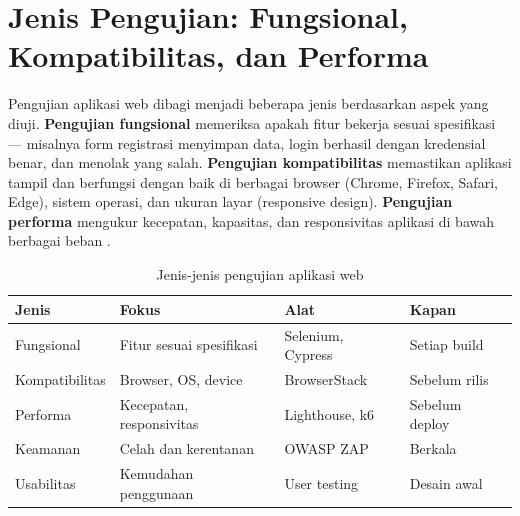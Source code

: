 ﻿\section{Jenis Pengujian: Fungsional, Kompatibilitas, dan Performa}

Pengujian aplikasi web dibagi menjadi beberapa jenis berdasarkan aspek yang diuji. \textbf{Pengujian fungsional} memeriksa apakah fitur bekerja sesuai spesifikasi --- misalnya form registrasi menyimpan data, login berhasil dengan kredensial benar, dan menolak yang salah. \textbf{Pengujian kompatibilitas} memastikan aplikasi tampil dan berfungsi dengan baik di berbagai browser (Chrome, Firefox, Safari, Edge), sistem operasi, dan ukuran layar (responsive design). \textbf{Pengujian performa} mengukur kecepatan, kapasitas, dan responsivitas aplikasi di bawah berbagai beban \cite{mdnToolsTesting}.

\begin{table}[H]
\centering
\begin{tabular}{|P{2.5cm}|P{4.5cm}|P{3cm}|P{2.5cm}|}
\hline
\textbf{Jenis} & \textbf{Fokus} & \textbf{Alat} & \textbf{Kapan} \\
\hline
Fungsional & Fitur sesuai spesifikasi & Selenium, Cypress & Setiap build \\
\hline
Kompatibilitas & Browser, OS, device & BrowserStack & Sebelum rilis \\
\hline
Performa & Kecepatan, responsivitas & Lighthouse, k6 & Sebelum deploy \\
\hline
Keamanan & Celah dan kerentanan & OWASP ZAP & Berkala \\
\hline
Usabilitas & Kemudahan penggunaan & User testing & Desain awal \\
\hline
\end{tabular}
\caption{Jenis-jenis pengujian aplikasi web}
\end{table}

